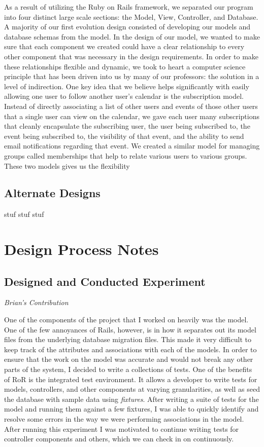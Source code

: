 \documentclass[11pt]{article}
\begin{document}
As a result of utilizing the Ruby on Rails framework, we separated our program into four distinct large scale sections: the Model, View, Controller, and Database.  A majority of our first evolution design consisted of developing our models and database schemas from the model.  In the design of our model, we wanted to make sure that each component we created could have a clear relationship to every other component that was necessary in the design requirements.  In order to make these relationships flexible and dynamic, we took to heart a computer science principle that has been driven into us by many of our professors: the solution in a level of indirection.  One key idea that we believe helps significantly with easily allowing one user to follow another user's calendar is the subscription model.  Instead of directly associating a list of other users and events of those other users that a single user can view on the calendar, we gave each user many subscriptions that cleanly encapsulate the subscribing user, the user being subscribed to, the event being subscribed to, the visibility of that event, and the ability to send email notifications regarding that event.  We created a similar model for managing groups called memberships that help to relate various users to various groups.  These two models gives us the flexibility 

\subsection{Alternate Designs}

stuf stuf stuf

\section{Design Process Notes}

\subsection{Designed and Conducted Experiment}

\textit{Brian's Contribution}

One of the components of the project that I worked on heavily was the model. One of the few annoyances of Rails, however, is in how it separates out its model files from the underlying database migration files. This made it very difficult to keep track of the attributes and associations with each of the models. In order to ensure that the work on the model was accurate and would not break any other parts of the system, I decided to write a collections of tests. One of the benefits of RoR is the integrated test environment. It allows a developer to write tests for models, controllers, and other components at varying granularities, as well as seed the database with sample data using \textit{fixtures}. After writing a suite of tests for the model and running them against a few fixtures, I was able to quickly identify and resolve some errors in the way we were performing associations in the model. After running this experiment I was motivated to continue writing tests for controller components and others, which we can check in on continuously. 
\end{document}

